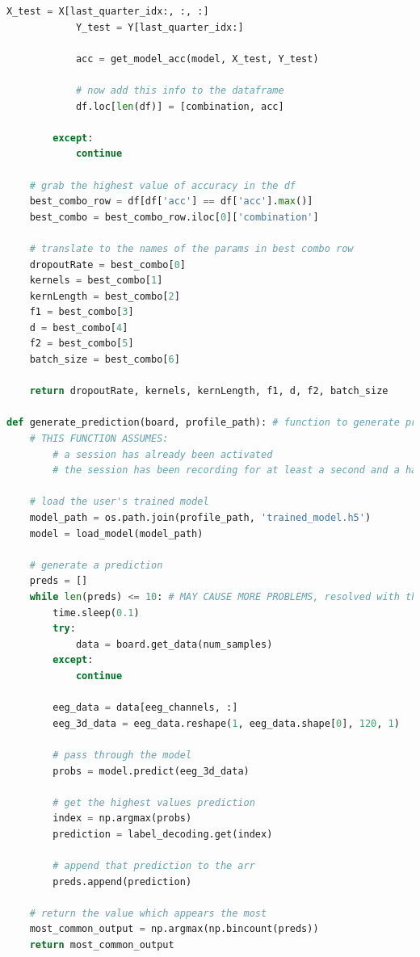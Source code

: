 \documentclass[conference]{IEEEtran}
\begin{document}
\begin{lstlisting}[language=Python, caption=Machine Learning Calls, label=ml_calls]
            X_test = X[last_quarter_idx:, :, :]
            Y_test = Y[last_quarter_idx:]

            acc = get_model_acc(model, X_test, Y_test)

            # now add this info to the dataframe
            df.loc[len(df)] = [combination, acc]

        except:
            continue

    # grab the highest value of accuracy in the df
    best_combo_row = df[df['acc'] == df['acc'].max()]
    best_combo = best_combo_row.iloc[0]['combination']

    # translate to the names of the params in best combo row
    dropoutRate = best_combo[0]
    kernels = best_combo[1]
    kernLength = best_combo[2]
    f1 = best_combo[3]
    d = best_combo[4]
    f2 = best_combo[5]
    batch_size = best_combo[6]

    return dropoutRate, kernels, kernLength, f1, d, f2, batch_size 

def generate_prediction(board, profile_path): # function to generate prediction given the trained model
    # THIS FUNCTION ASSUMES: 
        # a session has already been activated
        # the session has been recording for at least a second and a half alread

    # load the user's trained model
    model_path = os.path.join(profile_path, 'trained_model.h5')
    model = load_model(model_path)

    # generate a prediction
    preds = []
    while len(preds) <= 10: # MAY CAUSE MORE PROBLEMS, resolved with threading
        time.sleep(0.1)
        try:
            data = board.get_data(num_samples)
        except:
            continue

        eeg_data = data[eeg_channels, :]
        eeg_3d_data = eeg_data.reshape(1, eeg_data.shape[0], 120, 1)

        # pass through the model
        probs = model.predict(eeg_3d_data)
        
        # get the highest values prediction
        index = np.argmax(probs)
        prediction = label_decoding.get(index)

        # append that prediction to the arr
        preds.append(prediction)

    # return the value which appears the most
    most_common_output = np.argmax(np.bincount(preds))
    return most_common_output
    \end{lstlisting}
    
\end{document}
